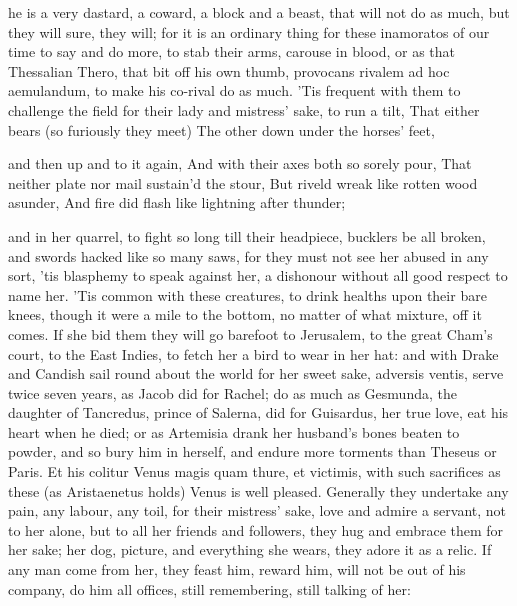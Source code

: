 {he is a very dastard, a coward, a block and a beast, that will not do
as much, but they will sure, they will; for it is an ordinary thing for
these inamoratos of our time to say and do more, to stab their arms,
carouse in blood, or as that Thessalian Thero, that bit off his
own thumb, provocans rivalem ad hoc aemulandum, to make his co-rival do
as much. 'Tis frequent with them to challenge the field for their lady
and mistress' sake, to run a tilt,
That either bears (so furiously they meet)
The other down under the horses' feet,

and then up and to it again,
And with their axes both so sorely pour,
That neither plate nor mail sustain'd the stour,
But riveld wreak like rotten wood asunder,
And fire did flash like lightning after thunder;

and in her quarrel, to fight so long till their headpiece,
bucklers be all broken, and swords hacked like so many saws, for they
must not see her abused in any sort, 'tis blasphemy to speak against
her, a dishonour without all good respect to name her. 'Tis common with
these creatures, to drink healths upon their bare knees, though
it were a mile to the bottom, no matter of what mixture, off it comes.
If she bid them they will go barefoot to Jerusalem, to the great Cham's
court,  to the East Indies, to fetch her a bird to wear in her
hat: and with Drake and Candish sail round about the world for her
sweet sake, adversis ventis, serve twice seven years, as Jacob did for
Rachel; do as much as Gesmunda, the daughter of Tancredus, prince
of Salerna, did for Guisardus, her true love, eat his heart when he
died; or as Artemisia drank her husband's bones beaten to powder, and
so bury him in herself, and endure more torments than Theseus or Paris.
Et his colitur Venus magis quam thure, et victimis, with such
sacrifices as these (as  Aristaenetus holds) Venus is well
pleased. Generally they undertake any pain, any labour, any toil, for
their mistress' sake, love and admire a servant, not to her alone, but
to all her friends and followers, they hug and embrace them for her
sake; her dog, picture, and everything she wears, they adore it as a
relic. If any man come from her, they feast him, reward him, will not
be out of his company, do him all offices, still remembering, still
talking of her:

}
